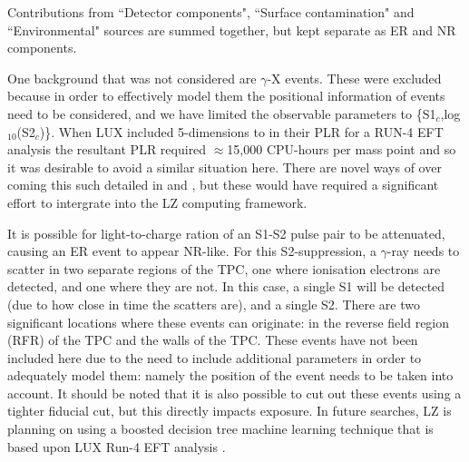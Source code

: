 Contributions from ``Detector components", ``Surface contamination" and ``Environmental" sources are summed together, but kept separate as ER and NR components.


\par
One background that was not considered are $\gamma$-X events.
These were excluded because in order to effectively model them the positional information of events need to be considered, and we have limited the observable parameters to \{S1$_c$,log$_{10}$(S2$_c$)\}. 
When LUX included 5-dimensions to in their PLR for a RUN-4 EFT analysis the resultant PLR required $\approx$15,000 CPU-hours per mass point \cite{billyboxer_thesis_ref} and so it was desirable to avoid a similar situation here.
There are novel ways of over coming this such detailed in \cite{flamenest_ref} and \cite{lux_ml_plr_ref}, but these would have required a significant effort to intergrate into the LZ computing framework.


\cite{gregrischbieter_thesis_ref}

It is possible for light-to-charge ration of an S1-S2 pulse pair to be attenuated, causing an ER event to appear NR-like.
For this S2-suppression, a $\gamma$-ray needs to scatter in two separate regions of the TPC, one where ionisation electrons are detected, and one where they are not.
In this case, a single S1 will be detected (due to how close in time the scatters are), and a single S2.
There are two significant locations where these events can originate: in the reverse field region (RFR) of the TPC and the walls of the TPC.
These events have not been included here due to the need to include additional parameters in order to adequately model them: namely the position of the event needs to be taken into account.
It should be noted that it is also possible to cut out these events using a tighter fiducial cut, but this directly impacts exposure.
In future searches, LZ is planning on using a boosted decision tree machine learning technique that is based upon LUX Run-4 EFT analysis \cite{LUX_RUN4_EFT_2021}.


